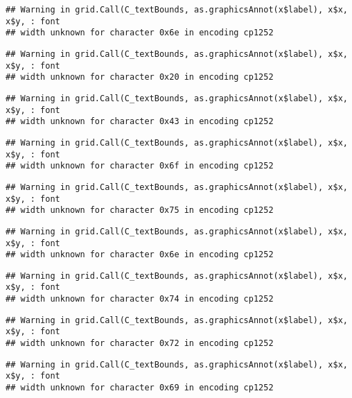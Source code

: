 \documentclass[
]{article}
\begin{document}
\begin{verbatim}
## Warning in grid.Call(C_textBounds, as.graphicsAnnot(x$label), x$x, x$y, : font
## width unknown for character 0x6e in encoding cp1252
\end{verbatim}

\begin{verbatim}
## Warning in grid.Call(C_textBounds, as.graphicsAnnot(x$label), x$x, x$y, : font
## width unknown for character 0x20 in encoding cp1252
\end{verbatim}

\begin{verbatim}
## Warning in grid.Call(C_textBounds, as.graphicsAnnot(x$label), x$x, x$y, : font
## width unknown for character 0x43 in encoding cp1252
\end{verbatim}

\begin{verbatim}
## Warning in grid.Call(C_textBounds, as.graphicsAnnot(x$label), x$x, x$y, : font
## width unknown for character 0x6f in encoding cp1252
\end{verbatim}

\begin{verbatim}
## Warning in grid.Call(C_textBounds, as.graphicsAnnot(x$label), x$x, x$y, : font
## width unknown for character 0x75 in encoding cp1252
\end{verbatim}

\begin{verbatim}
## Warning in grid.Call(C_textBounds, as.graphicsAnnot(x$label), x$x, x$y, : font
## width unknown for character 0x6e in encoding cp1252
\end{verbatim}

\begin{verbatim}
## Warning in grid.Call(C_textBounds, as.graphicsAnnot(x$label), x$x, x$y, : font
## width unknown for character 0x74 in encoding cp1252
\end{verbatim}

\begin{verbatim}
## Warning in grid.Call(C_textBounds, as.graphicsAnnot(x$label), x$x, x$y, : font
## width unknown for character 0x72 in encoding cp1252
\end{verbatim}

\begin{verbatim}
## Warning in grid.Call(C_textBounds, as.graphicsAnnot(x$label), x$x, x$y, : font
## width unknown for character 0x69 in encoding cp1252
\end{verbatim}
\end{document}
